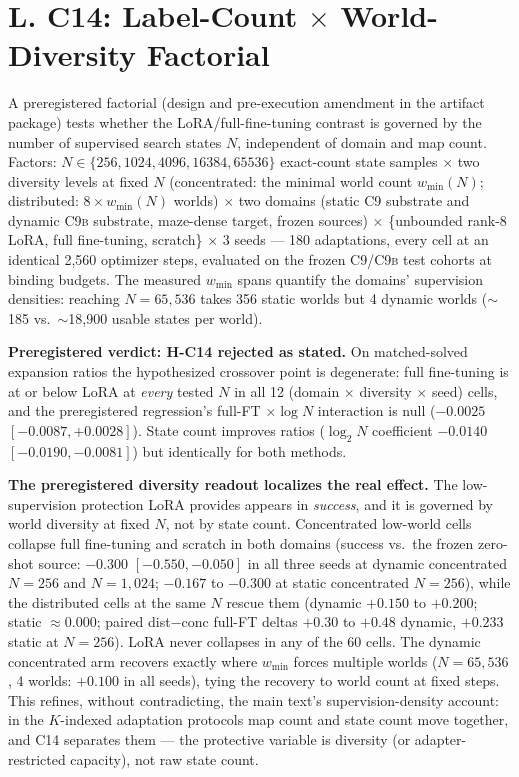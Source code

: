 \documentclass[letterpaper]{article} %
\newcommand{\stage}[1]{\textsc{#1}}
\begin{document}
\section{L. C14: Label-Count $\times$ World-Diversity Factorial}

A preregistered factorial (design and pre-execution amendment in the artifact package) tests whether the LoRA/full-fine-tuning contrast is governed by the number of supervised search states $N$, independent of domain and map count. Factors: $N \in \{256, 1024, 4096, 16384, 65536\}$ exact-count state samples $\times$ two diversity levels at fixed $N$ (concentrated: the minimal world count $w_{\min}(N)$; distributed: $8 \times w_{\min}(N)$ worlds) $\times$ two domains (static \stage{C9} substrate and dynamic \stage{C9b} substrate, maze-dense target, frozen sources) $\times$ \{unbounded rank-8 LoRA, full fine-tuning, scratch\} $\times$ 3 seeds --- 180 adaptations, every cell at an identical 2{,}560 optimizer steps, evaluated on the frozen \stage{C9}/\stage{C9b} test cohorts at binding budgets. The measured $w_{\min}$ spans quantify the domains' supervision densities: reaching $N{=}65{,}536$ takes 356 static worlds but 4 dynamic worlds ($\sim$185 vs.\ $\sim$18{,}900 usable states per world).

\textbf{Preregistered verdict: H-C14 rejected as stated.} On matched-solved expansion ratios the hypothesized crossover point is degenerate: full fine-tuning is at or below LoRA at \emph{every} tested $N$ in all 12 (domain $\times$ diversity $\times$ seed) cells, and the preregistered regression's full-FT $\times \log N$ interaction is null ($-0.0025$ $[-0.0087, +0.0028]$). State count improves ratios ($\log_2 N$ coefficient $-0.0140$ $[-0.0190, -0.0081]$) but identically for both methods.

\textbf{The preregistered diversity readout localizes the real effect.} The low-supervision protection LoRA provides appears in \emph{success}, and it is governed by world diversity at fixed $N$, not by state count. Concentrated low-world cells collapse full fine-tuning and scratch in both domains (success vs.\ the frozen zero-shot source: $-0.300$ $[-0.550,-0.050]$ in all three seeds at dynamic concentrated $N{=}256$ and $N{=}1{,}024$; $-0.167$ to $-0.300$ at static concentrated $N{=}256$), while the distributed cells at the same $N$ rescue them (dynamic $+0.150$ to $+0.200$; static $\approx 0.000$; paired dist$-$conc full-FT deltas $+0.30$ to $+0.48$ dynamic, $+0.233$ static at $N{=}256$). LoRA never collapses in any of the 60 cells. The dynamic concentrated arm recovers exactly where $w_{\min}$ forces multiple worlds ($N{=}65{,}536$, 4 worlds: $+0.100$ in all seeds), tying the recovery to world count at fixed steps. This refines, without contradicting, the main text's supervision-density account: in the $K$-indexed adaptation protocols map count and state count move together, and C14 separates them --- the protective variable is diversity (or adapter-restricted capacity), not raw state count.
\end{document}
